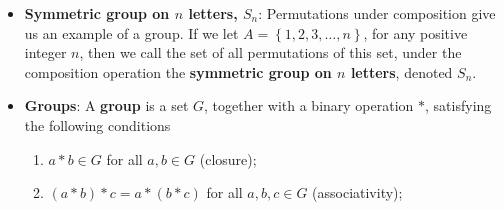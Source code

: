 \documentclass{report}
\begin{document}
\begin{itemize}
            \begin{enumerate}
                \item \textbf{Closure}: Permutations are closed under composition
                \item \textbf{Associativity}: For permutations $\sigma, \tau, \rho$, we have $\rho \circ (\sigma \circ \tau) = (\rho \circ \sigma) \circ \tau$
                \item \textbf{Identity}: If $\sigma$ is any permutation of $A$, then
                    \begin{align*}
                        \sigma \circ \begin{pmatrix} 1 & 2 & 3 \\ 1 & 2 & 3 \end{pmatrix} = \begin{pmatrix} 1 & 2 & 3 \\ 1 & 2  &3  \end{pmatrix} \circ \sigma = \sigma
                    .\end{align*}
                \item \textbf{Inverse}: For each permutation $\sigma$, there is another permutation $\tau$ such that
                    \begin{align*}
                        \sigma \circ \tau = \tau \circ \sigma = \begin{pmatrix} 1 & 2 & 3 \\ 1 & 2 & 3 \end{pmatrix}
                    .\end{align*}
            \end{enumerate}
            Note that we do not have commutativity, $\sigma \circ \tau \ne \tau \circ \sigma$ in general.
        \item \textbf{Symmetric group on $n$ letters, $S_{n}$}: Permutations under composition give us an example of a group. If we let $A = \left\{1,2,3,\dots, n\right\} $, for any positive integer $n$, then we call the set of all permutations of this set, under the composition operation the \textbf{symmetric group on $n$ letters}, denoted $S_{n}$.
        \item \textbf{Groups}: A \textbf{group} is a set $G$, together with a binary operation $*$, satisfying the following conditions
            \begin{enumerate}
                \item $a \ast b \in G$ for all $a,b \in G$ (closure);
                \item $(a \ast b) \ast c = a \ast (b \ast c)$ for all $a,b,c \in G$ (associativity);

\end{enumerate}
\end{itemize}
\end{document}
